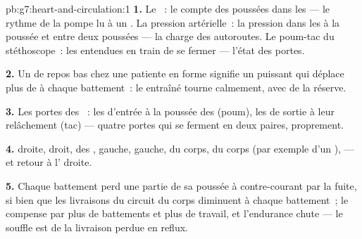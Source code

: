 \begin{solution}{pb:g7:heart-and-circulation:1}
\textbf{1.} Le ~: le compte des poussées dans les  --- le
rythme de la pompe lu à un . La pression artérielle~: la
pression dans les  à la poussée et entre deux poussées --- la
charge des autoroutes. Le poum-tac du stéthoscope~: les 
entendues en train de se fermer --- l'état des portes.

\textbf{2.} Un  de repos bas chez une patiente en forme signifie
un  puissant qui déplace plus de  à chaque battement~:
le  entraîné tourne calmement, avec de la réserve.

\textbf{3.} Les portes des ~: les  d'entrée à la poussée
des  (poum), les  de sortie à leur relâchement
(tac) --- quatre portes qui se ferment en deux paires, proprement.

\textbf{4.}  droite,  droit,  des
,  gauche,  gauche,  du corps,
 du corps (par exemple d'un ),  --- et retour
à l' droite.

\textbf{5.} Chaque battement perd une partie de sa poussée à
contre-courant par la fuite, si bien que les livraisons du circuit
du corps diminuent à chaque battement~; le  compense par plus de
battements et plus de travail, et l'endurance chute --- le souffle
est de la livraison perdue en reflux.


\end{solution}
